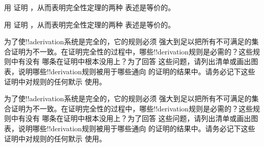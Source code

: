 \documentclass[../../../include/open-logic-section]{subfiles}
\begin{document}
\begin{prob}
用  证明
，从而表明完全性定理的两种
表述是等价的。
\end{prob}
\tagendprob

\begin{prob}
用  证明
，从而表明完全性定理的两种
表述是等价的。
\end{prob}
\tagendprob

\begin{prob}
为了使!!a{derivation}系统是完全的，它的规则必须
强大到足以把所有不可满足的集合证明为不一致。在证明完全性的过程中，哪些!!{derivation}规则是必需的？这些规则中有没有
哪条在证明中根本没用上？为了回答
这些问题，请列出清单或画出图表，说明哪些!!{derivation}规则被用于哪些通向
 的证明的结果中。请务必记下这些证明中对规则的任何默示
使用。
\end{prob}
\tagendprob

\begin{prob}
为了使!!a{derivation}系统是完全的，它的规则必须
强大到足以把所有不可满足的集合证明为不一致。在证明完全性的过程中，哪些!!{derivation}规则是必需的？这些规则中有没有
哪条在证明中根本没用上？为了回答
这些问题，请列出清单或画出图表，说明哪些!!{derivation}规则被用于哪些通向
 的证明的结果中。请务必记下这些证明中对规则的任何默示
使用。
\end{prob}
\tagendprob
\end{document}
